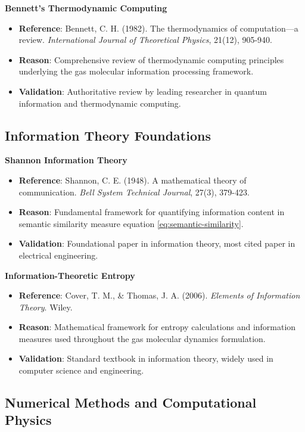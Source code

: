 \textbf{Bennett's Thermodynamic Computing}
\begin{itemize}
\item \textbf{Reference}: Bennett, C. H. (1982). The thermodynamics of computation—a review. \textit{International Journal of Theoretical Physics}, 21(12), 905-940.
\item \textbf{Reason}: Comprehensive review of thermodynamic computing principles underlying the gas molecular information processing framework.
\item \textbf{Validation}: Authoritative review by leading researcher in quantum information and thermodynamic computing.
\end{itemize}

\subsection{Information Theory Foundations}

\textbf{Shannon Information Theory}
\begin{itemize}
\item \textbf{Reference}: Shannon, C. E. (1948). A mathematical theory of communication. \textit{Bell System Technical Journal}, 27(3), 379-423.
\item \textbf{Reason}: Fundamental framework for quantifying information content in semantic similarity measure equation \ref{eq:semantic-similarity}.
\item \textbf{Validation}: Foundational paper in information theory, most cited paper in electrical engineering.
\end{itemize}

\textbf{Information-Theoretic Entropy}
\begin{itemize}
\item \textbf{Reference}: Cover, T. M., \& Thomas, J. A. (2006). \textit{Elements of Information Theory}. Wiley.
\item \textbf{Reason}: Mathematical framework for entropy calculations and information measures used throughout the gas molecular dynamics formulation.
\item \textbf{Validation}: Standard textbook in information theory, widely used in computer science and engineering.
\end{itemize}

\subsection{Numerical Methods and Computational Physics}

